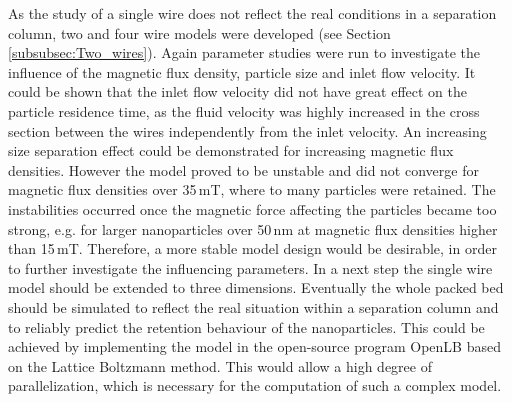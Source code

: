 As the study of a single wire does not reflect the real conditions in a separation column, two and four wire models were developed (see Section \ref{subsubsec:Two_wires}). Again parameter studies were run to investigate the influence of the magnetic flux density, particle size and inlet flow velocity. It could be shown that the inlet flow velocity did not have great effect on the particle residence time, as the fluid velocity was highly increased in the cross section between the wires independently from the inlet velocity. An increasing size separation effect could be demonstrated for increasing magnetic flux densities. However the model proved to be unstable and did not converge for magnetic flux densities over 35\,mT, where to many particles were retained. The instabilities occurred once the magnetic force affecting the particles became too strong, e.g. for larger nanoparticles over 50\,nm at magnetic flux densities higher than 15\,mT. Therefore, a more stable model design would be desirable, in order to further investigate the influencing parameters. In a next step the single wire model should be extended to three dimensions. Eventually the whole packed bed should be simulated to reflect the real situation within a separation column and to reliably predict the retention behaviour of the nanoparticles. This could be achieved by implementing the model in the open-source program OpenLB based on the Lattice Boltzmann method. This would allow a high degree of parallelization, which is necessary for the computation of such a complex model.     

